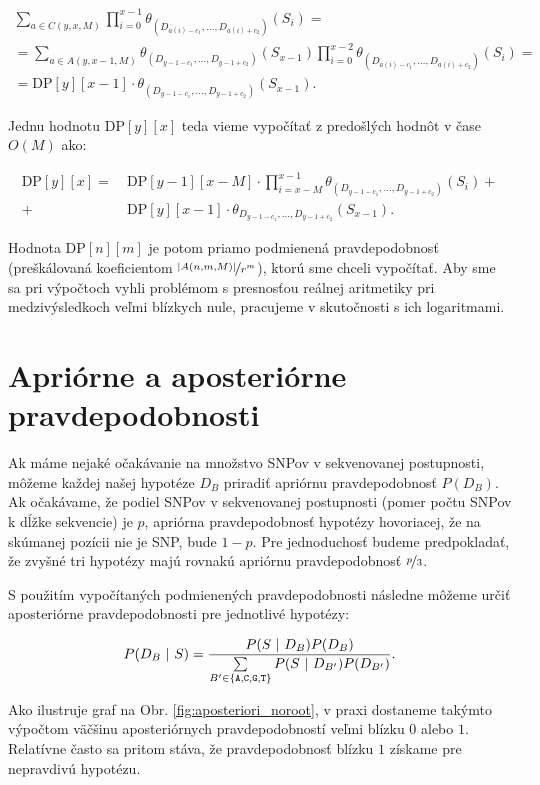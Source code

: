 \begin{multline*}
\sum\limits_{a \in C(y, x, M)} \prod\limits_{i=0}^{x-1} \theta_{(D_{a(i)-c_1}, \dots, D_{a(i)+c_2})}(S_i) = \\
= \sum\limits_{a \in A(y, x-1, M)} \theta_{(D_{y-1-c_1}, \dots, D_{y-1+c_2})}(S_{x-1}) \prod\limits_{i=0}^{x-2} \theta_{(D_{a(i)-c_1}, \dots, D_{a(i)+c_2})}(S_i)  = \\
= \mathrm{DP}[y][x-1] \cdot \theta_{(D_{y-1-c_1}, \dots, D_{y-1+c_2})}(S_{x-1}) \text{.}
\end{multline*}

Jednu hodnotu $\mathrm{DP}[y][x]$ teda vieme vypočítať z predošlých hodnôt v čase $O(M)$ ako:

\begin{align*}
\mathrm{DP}[y][x] =~ &\mathrm{DP}[y-1][x-M] \cdot \prod\limits_{i=x-M}^{x-1} \theta_{(D_{y-1-c_1}, \dots, D_{y-1+c_2})} (S_i) + \\
+~ &\mathrm{DP}[y][x-1] \cdot \theta_{D_{y-1-c_1}, \dots, D_{y-1+c_2}}(S_{x-1}) \text{.}
\end{align*}

Hodnota $\mathrm{DP}[n][m]$ je potom priamo podmienená pravdepodobnosť (preškálovaná koeficientom $\nicefrac{\abs*{A(n, m, M)}}{r^m}$),
 ktorú sme chceli vypočítať. Aby sme sa pri výpočtoch vyhli
problémom s presnosťou reálnej aritmetiky pri medzivýsledkoch veľmi blízkych nule, pracujeme v skutočnosti s ich
logaritmami.

\section{Apriórne a aposteriórne pravdepodobnosti}

Ak máme nejaké očakávanie na množstvo SNPov v sekvenovanej postupnosti, môžeme
každej našej hypotéze $D_B$ priradiť apriórnu pravdepodobnosť $P(D_B)$.
Ak očakávame, že podiel SNPov v sekvenovanej postupnosti (pomer počtu SNPov k dĺžke sekvencie) je $p$, 
apriórna pravdepodobnosť hypotézy hovoriacej, že na skúmanej pozícii nie je SNP, bude $1-p$.  Pre 
jednoduchosť budeme predpokladať, že zvyšné tri hypotézy majú rovnakú apriórnu pravdepodobnosť 
$\nicefrac{p}{3}$.

S použitím vypočítaných 
podmienených 
pravdepodobnosti následne môžeme určiť aposteriórne pravdepodobnosti pre jednotlivé hypotézy:

$$P(D_B ~|~ S) = \frac{P(S ~|~ D_B) P(D_B)}{\sum\limits_{B' \in \bazy}  P(S ~|~ D_{B'}) P(D_{B'})} 
\text{.}$$

Ako ilustruje graf na Obr. \ref{fig:aposteriori_noroot}, v praxi dostaneme takýmto výpočtom väčšinu aposteriórnych pravdepodobností veľmi blízku $0$ alebo $1$. Relatívne často
sa pritom stáva, že pravdepodobnosť blízku $1$ získame pre nepravdivú hypotézu.

